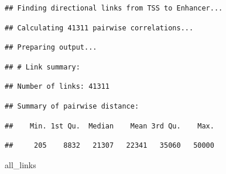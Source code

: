 \documentclass[9pt,a4paper,]{extarticle}
\newenvironment{Shaded}{\begin{snugshade}}{\end{snugshade}}
\newcommand{\NormalTok}[1]{{#1}}
\begin{document}
\begin{verbatim}
## Finding directional links from TSS to Enhancer...
\end{verbatim}

\begin{verbatim}
## Calculating 41311 pairwise correlations...
\end{verbatim}

\begin{verbatim}
## Preparing output...
\end{verbatim}

\begin{verbatim}
## # Link summary:
\end{verbatim}

\begin{verbatim}
## Number of links: 41311
\end{verbatim}

\begin{verbatim}
## Summary of pairwise distance:
\end{verbatim}

\begin{verbatim}
##    Min. 1st Qu.  Median    Mean 3rd Qu.    Max.
\end{verbatim}

\begin{verbatim}
##     205    8832   21307   22341   35060   50000
\end{verbatim}

\begin{Shaded}
\begin{Highlighting}[]
\NormalTok{all_links}
\end{Highlighting}
\end{Shaded}
\end{document}
